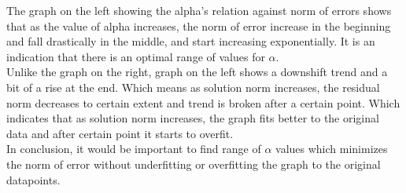 \documentclass[unicode,11pt,a4paper,oneside,numbers=endperiod,openany]{scrartcl}
\begin{document}
\begin{enumerate}[label=(\alph*)]
\newpage

The graph on the left showing the alpha's relation against norm of errors shows that as the value of alpha increases, the norm of error increase in the beginning and fall drastically in the middle, and start increasing exponentially. It is an indication that there is an optimal range of values for ${\alpha}$. \\

Unlike the graph on the right, graph on the left shows a downshift trend and a bit of a rise at the end. Which means as solution norm increases, the residual norm decreases to certain extent and trend is broken after a certain point. Which indicates that as solution norm increases, the graph fits better to the original data and after certain point it starts to overfit. \\

In conclusion, it would be important to find range of ${\alpha}$ values which minimizes the norm of error without underfitting or overfitting the graph to the original datapoints. 

\end{enumerate}
\end{document}
